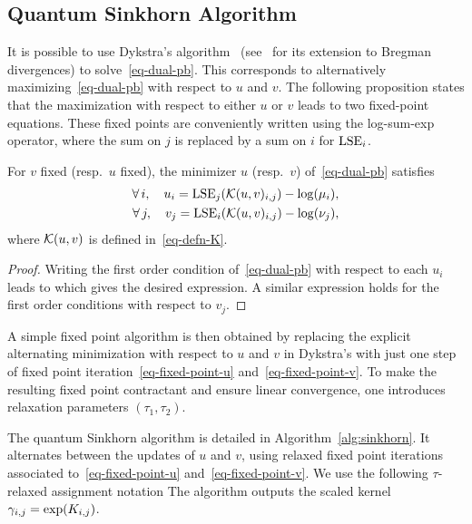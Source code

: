 \subsection{Quantum Sinkhorn Algorithm}

It is possible to use Dykstra's algorithm~ (see~\cite{bauschke-lewis} for its extension to Bregman divergences) to solve~\eqref{eq-dual-pb}. This corresponds to alternatively maximizing~\eqref{eq-dual-pb} with respect to $u$ and $v$. 
%
The following proposition states that the maximization with respect to either $u$ or $v$ leads to two fixed-point equations. 
%
These fixed points are conveniently written using the log-sum-exp operator, 
where the sum on $j$ is replaced by a sum on $i$ for $\operatorname{LSE}_i$. 

\begin{prop}\label{prop-fixed-points}
	For $v$ fixed (resp.\ $u$ fixed), the minimizer $u$ (resp.\ $v$) of~\eqref{eq-dual-pb} satisfies
	\begin{align}\label{eq-fixed-point-u}
		\forall \, i, \quad u_i = \operatorname{LSE}_j(\mathcal{K}(u,v)_{i,j})-\log(\mu_i), \\
		\forall \, j, \quad v_j = \operatorname{LSE}_i(\mathcal{K}(u,v)_{i,j})-\log(\nu_j), \label{eq-fixed-point-v}
	\end{align}
	where $\mathcal{K}(u,v)$ is defined in~\eqref{eq-defn-K}.
\end{prop}
\begin{proof}
	Writing the first order condition of~\eqref{eq-dual-pb} with respect to each $u_i$ leads to
	which gives the desired expression. A similar expression holds for the first order conditions with respect to $v_j$.
\end{proof}

A simple fixed point algorithm is then obtained by replacing the explicit alternating minimization with respect to $u$ and $v$ in Dykstra's with just one step of fixed point iteration~\eqref{eq-fixed-point-u} and~\eqref{eq-fixed-point-v}. To make the resulting fixed point contractant and ensure linear convergence, one introduces relaxation parameters $(\tau_1,\tau_2)$. 

The quantum Sinkhorn algorithm is detailed in Algorithm~\ref{alg:sinkhorn}. It alternates between the updates of $u$ and $v$, using relaxed fixed point iterations associated to~\eqref{eq-fixed-point-u} and~\eqref{eq-fixed-point-v}. We use the following $\tau$-relaxed assignment notation 
The algorithm outputs the scaled kernel $\gamma_{i,j} = \exp(K_{i,j})$.


